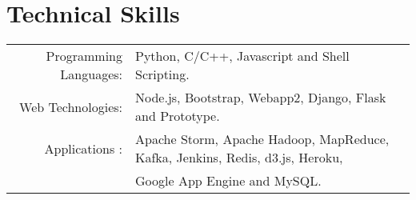 \section{Technical Skills}
\renewcommand{\arraystretch}{1}%
\begin{tabular}{rl}

Programming Languages: &  Python, C/C++, Javascript and Shell Scripting.\\
Web Technologies: & Node.js, Bootstrap, Webapp2, Django, Flask and Prototype.\\
Applications : & Apache Storm, Apache Hadoop, MapReduce, Kafka, Jenkins, Redis, d3.js, Heroku,\\
& Google App Engine and MySQL.\\
\end{tabular}
\vspace{5pt}
